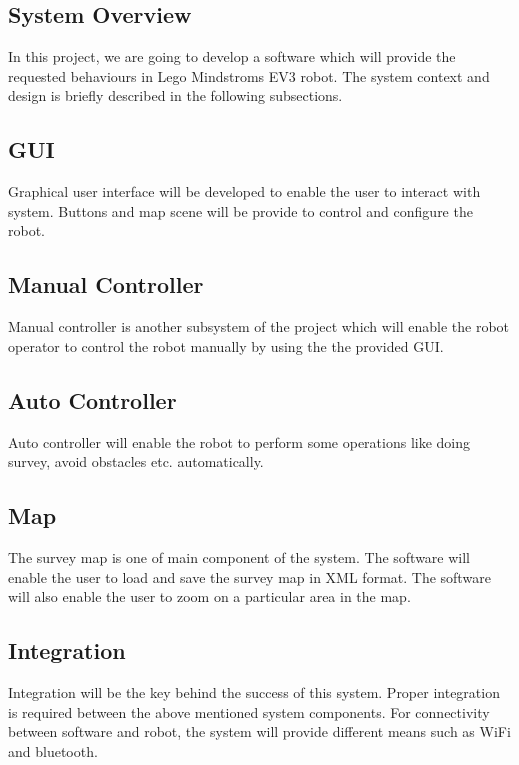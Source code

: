 \subsection{System Overview}
In this project, we are going to develop a software which will provide the requested behaviours in Lego Mindstroms EV3 robot. The system context and design is briefly described in the following subsections.
\subsection{GUI}
Graphical user interface will be developed to enable the user to interact with system. Buttons and map scene will be provide to control and configure the robot.  
\subsection{Manual Controller}
Manual controller is another subsystem of the project which will enable the robot operator to control the robot manually by using the the provided GUI. 
\subsection{Auto Controller}
Auto controller will enable the robot to perform some operations like doing survey, avoid obstacles etc. automatically. 
\subsection{Map}
The survey map is one of main component of the system. The software will enable the user to load and save the survey map in XML format. The software will also enable the user to zoom on a particular area in the map. 
\subsection{Integration}
Integration will be the key behind the success of this system. Proper integration is required between the above mentioned system components. For connectivity between software and robot, the system will provide different means such as WiFi and bluetooth.  
